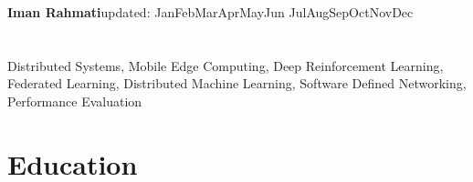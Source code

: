 \documentclass[11pt]{article}
\makeatletter
\newcommand*{\eduWithDetail}[5]
{\begin{table}[h!]
	\begin{tabular*}{\textwidth}{ll@{\extracolsep{\fill}}r}
		\textbf{#1} &  #2 & \\ %
		#3 &  & \\
		\multicolumn{3}{l}{#5}
	\end{tabular*}
\end{table}}
\newcommand*{\multilineCell}[1]
{\begin{tabular}[c]{@{}l@{}} #1
\end{tabular}}
\def\today{\number\day \space \ifcase\month\or
	Jan\or Feb\or Mar\or Apr\or May\or Jun\or
	Jul\or Aug\or Sep\or Oct\or Nov\or Dec\fi
	\space \number\year}
\makeatother
\begin{document}
	

	
%         
{\noindent \huge\bfseries Iman Rahmati}\hfill{\footnotesize updated: \today}
\vspace{-1cm}
\section{}
 \vspace{-2mm}

 Distributed Systems, Mobile Edge Computing, Deep Reinforcement Learning, Federated Learning, Distributed Machine Learning, Software Defined Networking, Performance Evaluation
\vspace{-2mm}
\section{Education}



\vspace{-5mm}
\end{document}
